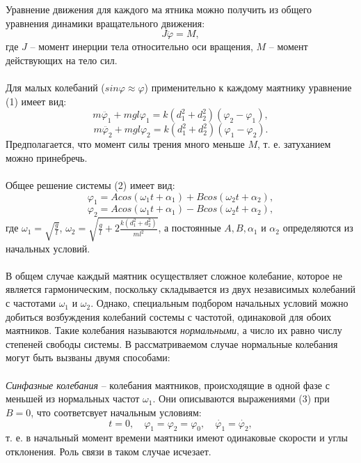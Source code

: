 \documentclass[a4paper]{article}
\begin{document}
\noindent Уравнение движения для каждого ма ятника можно получить из общего уравнения динамики вращательного движения:
\begin{equation}
J\ddot{\varphi} = M,
\end{equation}
где $J$ -- момент инерции тела относительно оси вращения, $M$ -- момент действующих на тело сил.\\\\
Для малых колебаний ($sin{\varphi} \approx \varphi$) применительно к каждому маятнику уравнение (1) имеет вид:
\[
m\ddot{\varphi_1} + mgl\varphi_1 = k(d_1^2 + d_2^2)(\varphi_2-\varphi_1), 
\]
\begin{equation}
m\ddot{\varphi_2} + mgl\varphi_2 = k(d_1^2 + d_2^2)(\varphi_1-\varphi_2).
\end{equation}
Предполагается, что момент силы трения много меньше $M$, т. е. затуханием можно принебречь.\\ \\
Общее решение системы (2) имеет вид:
\[
\varphi_1 = Acos(\omega_1t + \alpha_1) + Bcos(\omega_2t + \alpha_2),
\]
\begin{equation}
\varphi_2 = Acos(\omega_1t + \alpha_1) - Bcos(\omega_2t + \alpha_2),
\end{equation}
где $\omega_1 = \sqrt{\frac{g}{l}}$, $\omega_2 = \sqrt{\frac{g}{l} + 2\frac{k(d_1^2 + d_2^2)}{ml^2}}$, а постоянные $A, B, \alpha_1$ и $\alpha_2$ определяются из начальных условий. \\ \\
В общем случае каждый маятник осуществляет сложное колебание, которое не является гармоническим, поскольку складывается из двух независимых колебаний с частотами $\omega_1$ и $\omega_2$. Однако, специальным подбором начальных условий можно добиться возбуждения колебаний состемы с частотой, одинаковой для обоих маятников. Такие колебания называются \textit{нормальными}, а число их равно числу степеней свободы системы. В рассматриваемом случае нормальные колебания могут быть вызваны двумя способами:  \\ \\
\textit{Синфазные колебания} -- колебания маятников, происходящие в одной фазе с меньшей из нормальных частот $\omega_1$. Они описываются выражениями (3) при $B=0$, что соответсвует начальным условиям:
\begin{equation}
t=0, \quad \varphi_1=\varphi_2=\varphi_0, \quad \dot{\varphi_1}=\dot{\varphi_2},
\end{equation}
т. е. в начальный момент времени маятники имеют одинаковые скорости и углы отклонения. Роль связи в таком случае исчезает. \\ \\
\end{document}
